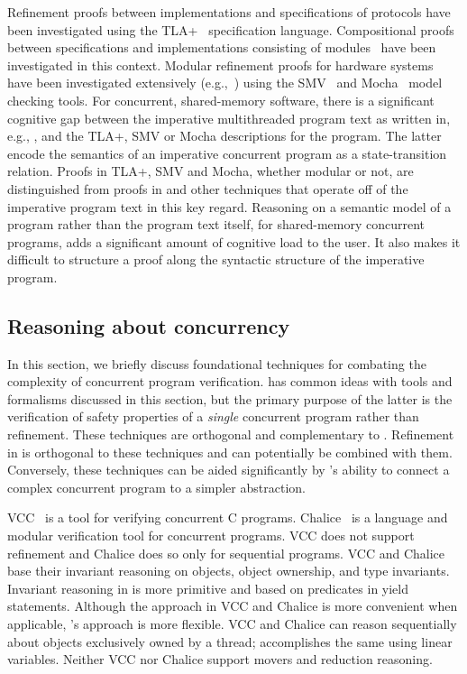 Refinement proofs
between implementations and specifications of protocols have been
investigated using the TLA+~\cite{Lamport2004} specification
language. 
Compositional proofs between specifications and
implementations consisting of modules~\cite{AbadiAssumeGuarantee} have
been investigated in this context. 
Modular refinement proofs for hardware systems have been investigated extensively
(e.g.,~\cite{Henzinger1999,Eiriksson2000}) using the SMV~\cite{McMillan00} and Mocha~\cite{AlurHMQRT98} 
model checking tools.
For concurrent, shared-memory
software, there is a significant cognitive gap between the imperative
multithreaded program text as written in, e.g., \civl, and the TLA+,
SMV or Mocha descriptions for the program. 
The latter encode the
semantics of an imperative concurrent program as a
state-transition relation. 
Proofs in TLA+, SMV and Mocha, whether modular or not, are
distinguished from proofs in \civl and other techniques that operate
off of the imperative program text in this key regard. 
Reasoning on a
semantic model of a program rather than the program text itself, for
shared-memory concurrent programs, adds a significant amount of
cognitive load to the user. 
It also makes it difficult to structure a
proof along the syntactic structure of the imperative program. 

\subsection{Reasoning about concurrency}
In this section, we briefly discuss foundational techniques
for combating the complexity of concurrent program verification. 
\civl has common ideas with tools and formalisms
discussed in this section, but the primary purpose of the latter 
is the verification of safety properties of a {\em single} concurrent program rather than refinement. 
These techniques are orthogonal and complementary to \civl.
Refinement in \civl is orthogonal to these techniques and can potentially be combined with them.
Conversely, these techniques can be aided significantly by \civl's 
ability to connect a complex concurrent program to a simpler abstraction.

VCC~\cite{VCC} is a tool for verifying concurrent C programs.  
Chalice~\cite{LM09} is a language and modular verification tool for concurrent programs. 
VCC does not support refinement and Chalice does so only for sequential programs.  
VCC and Chalice base their invariant reasoning on objects, object ownership, and type invariants. 
Invariant reasoning in \civl is more primitive and based on predicates in yield statements. 
Although the approach in VCC and Chalice is more convenient when applicable, \civl's approach is more flexible. 
VCC and Chalice can reason sequentially about objects exclusively owned by a thread;
\civl accomplishes the same using linear variables.
Neither VCC nor Chalice support movers and reduction reasoning.

